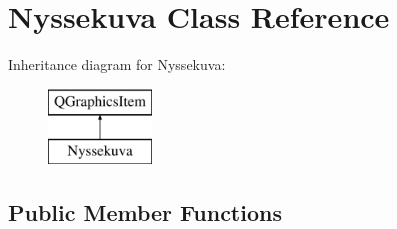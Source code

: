 \hypertarget{class_nyssekuva}{\section{Nyssekuva Class Reference}
\label{class_nyssekuva}
}
Inheritance diagram for Nyssekuva\-:\begin{figure}[H]
\begin{center}
\leavevmode
\includegraphics[height=2.000000cm]{class_nyssekuva}
\end{center}
\end{figure}
\subsection*{Public Member Functions}
